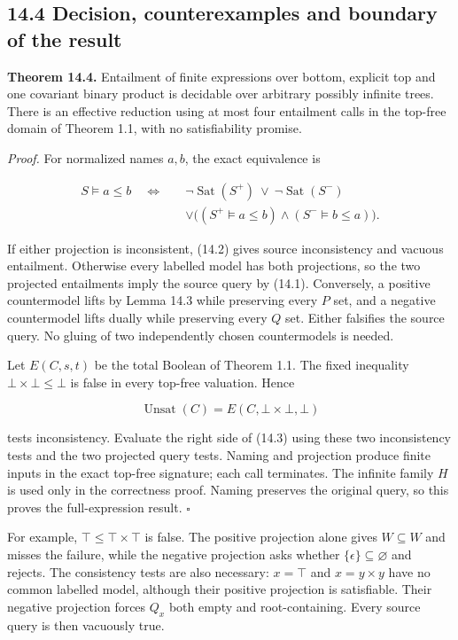 \documentclass[
  11pt,
  a4paper,
]{article}
\begin{document}
\subsection{14.4 Decision, counterexamples and boundary of the
result}\label{decision-counterexamples-and-boundary-of-the-result}


\textbf{Theorem 14.4.} Entailment of finite expressions over bottom,
explicit top and one covariant binary product is decidable over
arbitrary possibly infinite trees. There is an effective reduction using
at most four entailment calls in the top-free domain of Theorem 1.1,
with no satisfiability promise.

\emph{Proof.} For normalized names \(a,b\), the exact equivalence is

\[\begin{aligned}
S\models a\le b\quad\Longleftrightarrow\quad
&\neg\operatorname{Sat}(S^+)\ \lor\ \neg\operatorname{Sat}(S^-)\\
&\lor\bigl((S^+\models a\le b)\land(S^-\models b\le a)\bigr).
\end{aligned} \tag{14.3}\]

If either projection is inconsistent, (14.2) gives source inconsistency
and vacuous entailment. Otherwise every labelled model has both
projections, so the two projected entailments imply the source query by
(14.1). Conversely, a positive countermodel lifts by Lemma 14.3 while
preserving every \(P\) set, and a negative countermodel lifts dually
while preserving every \(Q\) set. Either falsifies the source query. No
gluing of two independently chosen countermodels is needed.

Let \(E(C,s,t)\) be the total Boolean of Theorem 1.1. The fixed
inequality \(\bot\times\bot\le\bot\) is false in every top-free
valuation. Hence

\[\operatorname{Unsat}(C)=E(C,\bot\times\bot,\bot)\]

tests inconsistency. Evaluate the right side of (14.3) using these two
inconsistency tests and the two projected query tests. Naming and
projection produce finite inputs in the exact top-free signature; each
call terminates. The infinite family \(H\) is used only in the
correctness proof. Naming preserves the original query, so this proves
the full-expression result. \(\square\)

For example, \(\top\le\top\times\top\) is false. The positive projection
alone gives \(W\subseteq W\) and misses the failure, while the negative
projection asks whether \(\{\epsilon\}\subseteq\varnothing\) and
rejects. The consistency tests are also necessary: \(x=\top\) and
\(x=y\times y\) have no common labelled model, although their positive
projection is satisfiable. Their negative projection forces \(Q_x\) both
empty and root-containing. Every source query is then vacuously true.
\end{document}
